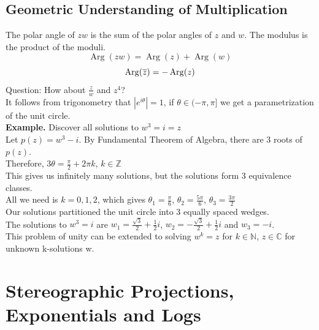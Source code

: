 \documentclass[11pt]{article}
\begin{document}
\subsection{Geometric Understanding of Multiplication}
The polar angle of $zw$ is the sum of the polar angles of $z$ and $w$. The modulus is the product of the moduli. 
$$ \operatorname{Arg}(zw) = \operatorname{Arg}(z) + \operatorname{Arg}(w)$$
$$ \operatorname{Arg}(\overline{z}) = -\operatorname{Arg}(z)$$
Question: How about $\frac{z}{w}$ and $z^4$? \\
It follows from trigonometry that $|e^{i\theta}| = 1$, if $\theta \in (-\pi, \pi]$ we get a parametrization of the unit circle. \\
\newline
\textbf{Example.} Discover all solutions to $w^3 = i = z$ \\
Let $p(z) = w^3 - i$. By Fundamental Theorem of Algebra, there are 3 roots of $p(z)$. \\
Therefore, $3\theta= \frac{\pi}{2} + 2\pi k$, $k \in \mathbb{Z}$ \\
This gives us infinitely many solutions, but the solutions form 3 equivalence classes. \\
All we need is $k = 0, 1, 2$, which gives $\theta_1 = \frac{\pi}{6}$, $\theta_2 = \frac{5\pi}{6}$, $\theta_3 = \frac{3\pi}{2}$ \\
Our solutions partitioned the unit circle into 3 equally spaced wedges. \\
The solutions to $w^3 = i$ are $w_1 = \frac{\sqrt3}{2} + \frac{1}{2}i$, $w_2 = -\frac{\sqrt3}{2} + \frac{1}{2}i$ and $w_3 = -i$. \\
This problem of unity can be extended to solving $w^k = z$ for $k \in \mathbb{N}$, $z \in \mathbb{C}$ for unknown k-solutions w.  


\newpage
\section{Stereographic Projections, Exponentials and Logs}
\end{document}
